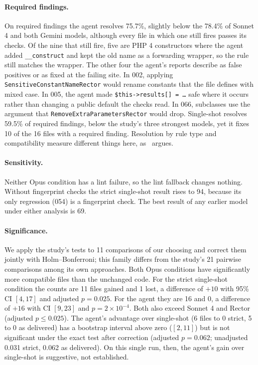 \documentclass[11pt]{article}
\newcommand{\code}[1]{\texttt{#1}}
\begin{document}
\paragraph{Required findings.}
On required findings the agent resolves 75.7\%, slightly below the 78.4\% of Sonnet 4 and both Gemini models, although every file in which one still fires passes its checks.
Of the nine that still fire, five are PHP 4 constructors where the agent added \code{\_\_construct} and kept the old name as a forwarding wrapper, so the rule still matches the wrapper.
The other four the agent's reports describe as false positives or as fixed at the failing site.
In 002, applying \code{SensitiveConstantNameRector} would rename constants that the file defines with mixed case.
In 005, the agent made \code{\$this->results[] = \ldots} safe where it occurs rather than changing a public default the checks read.
In 066, subclasses use the argument that \code{RemoveExtraParametersRector} would drop.
Single-shot resolves 59.5\% of required findings, below the study's three strongest models, yet it fixes 10 of the 16 files with a required finding.
Resolution by rule type and compatibility measure different things here, as~\cite{mahmud2026modernization} argues.

\paragraph{Sensitivity.}
Neither Opus condition has a lint failure, so the lint fallback changes nothing.
Without fingerprint checks the strict single-shot result rises to 94, because its only regression (054) is a fingerprint check.
The best result of any earlier model under either analysis is 69.

\paragraph{Significance.}
We apply the study's tests to 11 comparisons of our choosing and correct them jointly with Holm--Bonferroni; this family differs from the study's 21 pairwise comparisons among its own approaches.
Both Opus conditions have significantly more compatible files than the unchanged code.
For the strict single-shot condition the counts are 11 files gained and 1 lost, a difference of $+10$ with 95\% CI $[4, 17]$ and adjusted $p = 0.025$.
For the agent they are 16 and 0, a difference of $+16$ with CI $[9, 23]$ and $p = 2\times10^{-4}$.
Both also exceed Sonnet 4 and Rector (adjusted $p \le 0.025$).
The agent's advantage over single-shot (6 files to 0 strict, 5 to 0 as delivered) has a bootstrap interval above zero ($[2, 11]$) but is not significant under the exact test after correction (adjusted $p = 0.062$; unadjusted 0.031 strict, 0.062 as delivered).
On this single run, then, the agent's gain over single-shot is suggestive, not established.
\end{document}
